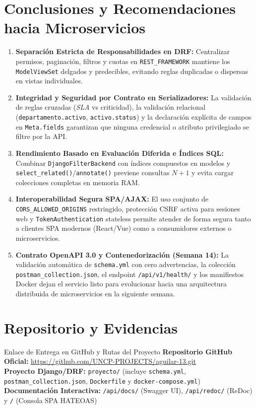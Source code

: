 \documentclass[10pt,a4paper]{article}
\begin{document}
\section{Conclusiones y Recomendaciones hacia Microservicios}
\begin{enumerate}
    \item \textbf{Separación Estricta de Responsabilidades en DRF:} Centralizar permisos, paginación, filtros y cuotas en \texttt{REST\_FRAMEWORK} mantiene los \texttt{ModelViewSet} delgados y predecibles, evitando reglas duplicadas o dispersas en vistas individuales.
    \item \textbf{Integridad y Seguridad por Contrato en Serializadores:} La validación de reglas cruzadas (\textit{SLA} vs criticidad), la validación relacional (\texttt{departamento.activo}, \texttt{activo.status}) y la declaración explícita de campos en \texttt{Meta.fields} garantizan que ninguna credencial o atributo privilegiado se filtre por la API.
    \item \textbf{Rendimiento Basado en Evaluación Diferida e Índices SQL:} Combinar \texttt{DjangoFilterBackend} con índices compuestos en modelos y \texttt{select\_related()}/\texttt{annotate()} previene consultas $N+1$ y evita cargar colecciones completas en memoria RAM.
    \item \textbf{Interoperabilidad Segura SPA/AJAX:} El uso conjunto de \texttt{CORS\_ALLOWED\_ORIGINS} restringido, protección CSRF activa para sesiones web y \texttt{TokenAuthentication} stateless permite atender de forma segura tanto a clientes SPA modernos (React/Vue) como a consumidores externos o microservicios.
    \item \textbf{Contrato OpenAPI 3.0 y Contenedorización (Semana 14):} La validación automática de \texttt{schema.yml} con cero advertencias, la colección \texttt{postman\_collection.json}, el endpoint \texttt{/api/v1/health/} y los manifiestos Docker dejan el servicio listo para evolucionar hacia una arquitectura distribuida de microservicios en la siguiente semana.
\end{enumerate}

\newpage

\section*{Repositorio y Evidencias}
\begin{uncpnote}{Enlace de Entrega en GitHub y Rutas del Proyecto}
\textbf{Repositorio GitHub Oficial:} \url{https://github.com/UNCP-PROJECTS/aguilar-13.git}\\
\textbf{Proyecto Django/DRF:} \texttt{proyecto/} (incluye \texttt{schema.yml}, \texttt{postman\_collection.json}, \texttt{Dockerfile} y \texttt{docker-compose.yml})\\
\textbf{Documentación Interactiva:} \texttt{/api/docs/} (Swagger UI), \texttt{/api/redoc/} (ReDoc) y \texttt{/} (Consola SPA HATEOAS)
\end{uncpnote}
\end{document}

